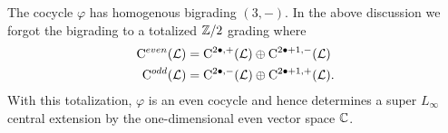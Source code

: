 The cocycle $\varphi$ has homogenous bigrading $(3,-)$.
In the above discussion we forgot the bigrading to a totalized $\mathbb Z/2$ grading where 
\begin{align*}
{\rm C}^{even} (\mathcal L) & = {\rm C}^{2\bullet , +} (\mathcal L) \oplus {\rm C}^{2\bullet+1, -}(\mathcal L) \\
{\rm C}^{odd} (\mathcal L) & = {\rm C}^{2\bullet , -} (\mathcal L) \oplus {\rm C}^{2\bullet+1, +}(\mathcal L) .
\end{align*}
With this totalization, $\varphi$ is an even cocycle and hence determines a super $L_\infty$ central extension by the one-dimensional even vector space $\mathbb C$. 



